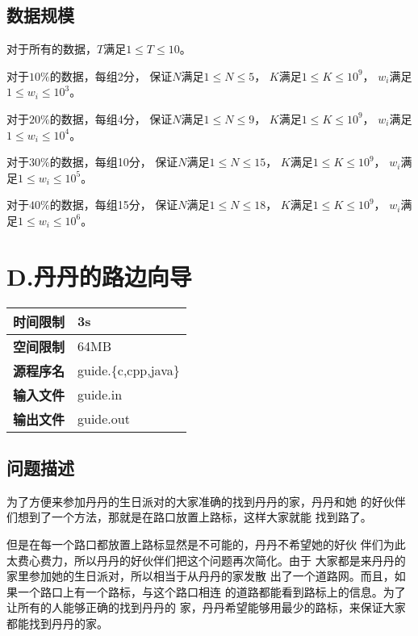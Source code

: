 \documentclass{article}
\begin{document}
\subsection*{数据规模}
对于所有的数据，$T$满足$1 \leq T \leq 10$。

对于$10\%$的数据，每组2分，
保证$N$满足$1 \leq N \leq 5$，
$K$满足$1 \leq K \leq 10^{9}$，
$w_i$满足$1 \leq w_i \leq 10^{3}$。

对于$20\%$的数据，每组4分，
保证$N$满足$1 \leq N \leq 9$，
$K$满足$1 \leq K \leq 10^{9}$，
$w_i$满足$1 \leq w_i \leq 10^{4}$。

对于$30\%$的数据，每组10分，
保证$N$满足$1 \leq N \leq 15$，
$K$满足$1 \leq K \leq 10^{9}$，
$w_i$满足$1 \leq w_i \leq 10^{5}$。

对于$40\%$的数据，每组15分，
保证$N$满足$1 \leq N \leq 18$，
$K$满足$1 \leq K \leq 10^{9}$，
$w_i$满足$1 \leq w_i \leq 10^{6}$。

\clearpage

\section*{D.丹丹的路边向导}
\begin{longtable}{|c|l|}
 \hline \bfseries{时间限制} & 3s \\
 \hline \bfseries{空间限制} & 64MB \\
 \hline \bfseries{源程序名} & guide.\{c,cpp,java\} \\
 \hline \bfseries{输入文件} & guide.in \\
 \hline \bfseries{输出文件} & guide.out \\
 \hline 
\end{longtable}

\subsection*{问题描述}
为了方便来参加丹丹的生日派对的大家准确的找到丹丹的家，丹丹和她
的好伙伴们想到了一个方法，那就是在路口放置上路标，这样大家就能
找到路了。

但是在每一个路口都放置上路标显然是不可能的，丹丹不希望她的好伙
伴们为此太费心费力，所以丹丹的好伙伴们把这个问题再次简化。由于
大家都是来丹丹的家里参加她的生日派对，所以相当于从丹丹的家发散
出了一个道路网。而且，如果一个路口上有一个路标，与这个路口相连
的道路都能看到路标上的信息。为了让所有的人能够正确的找到丹丹的
家，丹丹希望能够用最少的路标，来保证大家都能找到丹丹的家。
\end{document}
